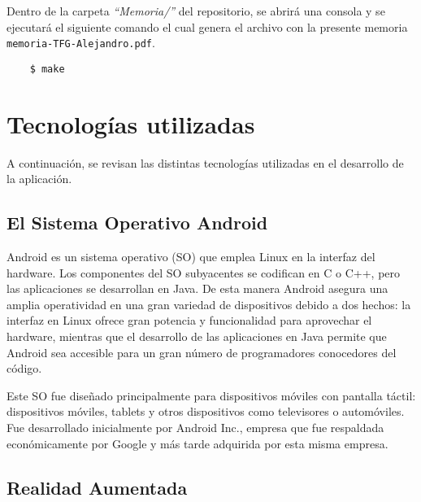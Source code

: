 Dentro de la carpeta \textit{``Memoria/''} del repositorio, se abrirá una consola y se ejecutará el siguiente comando el cual genera el archivo con la presente memoria \texttt{memoria-TFG-Alejandro.pdf}.
\begin{lstlisting}
    $ make
\end{lstlisting}

\bigskip
\bigskip
\bigskip

\section{Tecnologías utilizadas}

A continuación, se revisan las distintas tecnologías utilizadas en el desarrollo de la aplicación.

\subsection{El Sistema Operativo Android}

Android \cite{URL::Android} es un sistema operativo (SO) que emplea Linux en la interfaz del hardware.  Los componentes del SO subyacentes se codifican en C o C++, pero las aplicaciones se desarrollan en Java. De esta manera Android asegura una amplia operatividad en una gran variedad de dispositivos debido a dos hechos: la interfaz en Linux ofrece gran potencia y funcionalidad para aprovechar el hardware, mientras que el desarrollo de las aplicaciones en Java permite que Android sea accesible para un gran número de programadores conocedores del código.

Este SO fue diseñado principalmente para dispositivos móviles con pantalla táctil: dispositivos móviles, tablets y otros dispositivos como televisores o automóviles. Fue desarrollado inicialmente por Android Inc., empresa que fue respaldada económicamente por Google y más tarde adquirida por esta misma empresa.


\subsection{Realidad Aumentada}

